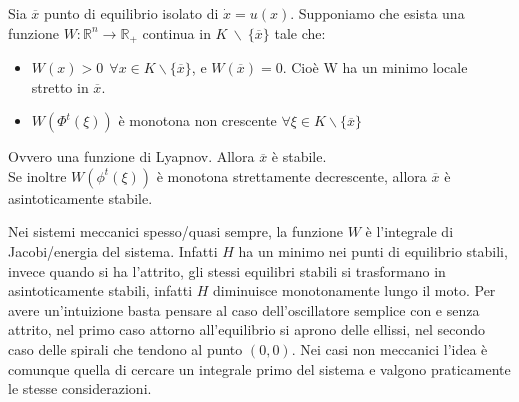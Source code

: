 \documentclass[Main.tex]{subfiles}
\begin{document}
\newpage
\begin{teo}[Lyapunov] 
  	Sia $\overline x$ punto di equilibrio isolato di $\dot x = u(x)$. Supponiamo che esista una funzione $W: \mathbb{R}^n \rightarrow \mathbb{R}_+$ continua in $K \  \backslash \ \{\overline x \}$ tale che:
  	\begin{itemize}
  		\item $W(x) > 0 \ \ \forall x \in K \backslash  \{\overline x \}$, e $W(\overline x) =0$. Cioè W ha un minimo locale stretto in $\overline x$.
  		\item $W( \Phi^t (\xi))$ è monotona non crescente $\forall \xi \in K \backslash  \{ \overline x \}$
  	\end{itemize}
  	Ovvero una funzione di Lyapnov.
  	Allora $\overline x$ è stabile. \\ Se inoltre $W(\phi^t (\xi))$ è monotona strettamente decrescente, allora $\overline x $ è asintoticamente stabile.
  \end{teo}
  
  \begin{osservazione}
  	Nei sistemi meccanici spesso/quasi sempre, la funzione $W$ è l'integrale di Jacobi/energia del sistema. Infatti $H$ ha un minimo nei punti di equilibrio stabili, invece quando si ha l'attrito, gli stessi equilibri stabili si trasformano in asintoticamente stabili, infatti $H$ diminuisce monotonamente lungo il moto. Per avere un'intuizione basta pensare al caso dell'oscillatore semplice con e senza attrito, nel primo caso attorno all'equilibrio si aprono delle ellissi, nel secondo caso delle spirali che tendono al punto $(0,0)$. Nei casi non meccanici l'idea è comunque quella di cercare un integrale primo del sistema e valgono praticamente le stesse considerazioni.
  \end{osservazione}
\end{document}
